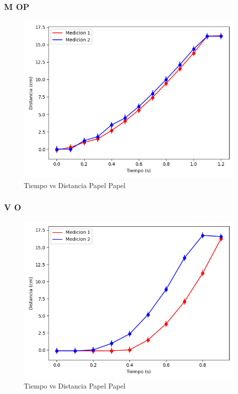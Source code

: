 \documentclass[12pt,a4]{article}
\begin{document}
\subsubsection{M OP}

\begin{figure}[H]
    \centering
    \includegraphics[width=0.9\linewidth]{TiempoVsDistanciaPapelPapelM_OP.png}
    \caption{Tiempo vs Distancia Papel Papel}
    \label{fig:TvDM_OP papel papel}
\end{figure}

\subsubsection{V O}

\begin{figure}[H]
    \centering
    \includegraphics[width=0.9\linewidth]{TiempoVsDistanciaPapelPapelV_O.png}
    \caption{Tiempo vs Distancia Papel Papel}
    \label{fig:TvDV_O papel papel}
\end{figure}
\end{document}
